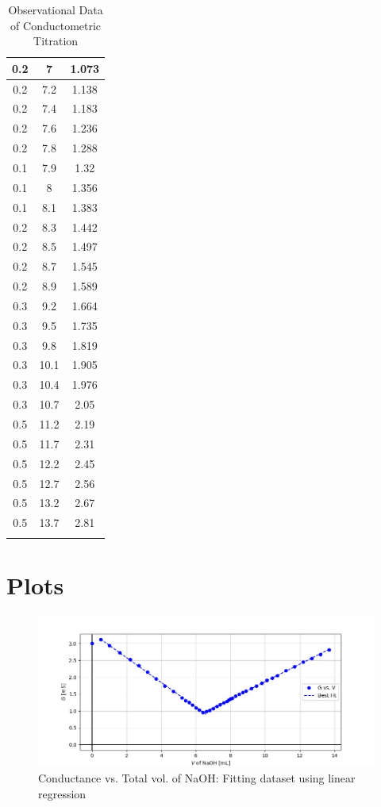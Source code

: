 \documentclass[11pt, a4paper, abstract=true]{scrartcl}
\begin{document}
\begin{longtable}[c]{|c|c|c|}
    0.2 & 7    & 1.073 \\ \hline
    0.2 & 7.2  & 1.138 \\ \hline
    0.2 & 7.4  & 1.183 \\ \hline
    0.2 & 7.6  & 1.236 \\ \hline
    0.2 & 7.8  & 1.288 \\ \hline
    0.1 & 7.9  & 1.32  \\ \hline
    0.1 & 8    & 1.356 \\ \hline
    0.1 & 8.1  & 1.383 \\ \hline
    0.2 & 8.3  & 1.442 \\ \hline
    0.2 & 8.5  & 1.497 \\ \hline
    0.2 & 8.7  & 1.545 \\ \hline
    0.2 & 8.9  & 1.589 \\ \hline
    0.3 & 9.2  & 1.664 \\ \hline
    0.3 & 9.5  & 1.735 \\ \hline
    0.3 & 9.8  & 1.819 \\ \hline
    0.3 & 10.1 & 1.905 \\ \hline
    0.3 & 10.4 & 1.976 \\ \hline
    0.3 & 10.7 & 2.05  \\ \hline
    0.5 & 11.2 & 2.19  \\ \hline
    0.5 & 11.7 & 2.31  \\ \hline
    0.5 & 12.2 & 2.45  \\ \hline
    0.5 & 12.7 & 2.56  \\ \hline
    0.5 & 13.2 & 2.67  \\ \hline
    0.5 & 13.7 & 2.81  \\ \hline
    \caption{Observational Data of Conductometric Titration}
    \end{longtable}
\section{Plots}

\begin{figure}[H]
    \centering
    \includegraphics[scale=0.45]{plot.jpeg}
    \caption{Conductance vs. Total vol. of NaOH: Fitting dataset using linear regression}
\end{figure}
\end{document}
